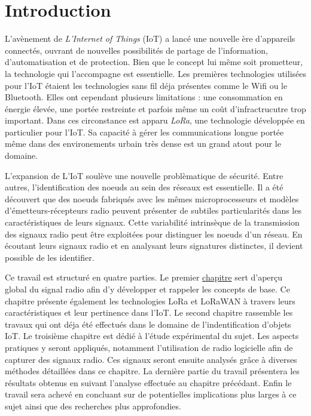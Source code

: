 

\chapter*{Introduction}

\renewcommand{\leftmark}{INTRODUCTION}

L'avènement de \textit{L'Internet of Things} (IoT) a lancé une nouvelle ère d'appareils connectés, ouvrant de nouvelles possibilités de partage de l'information, d'automatisation et de protection. Bien que le concept lui même soit prometteur, la technologie qui l'accompagne est essentielle.
Les premières technologies utilisées pour l'IoT étaient les technologies sans fil déja présentes comme le Wifi ou le Bluetooth. Elles ont cependant plusieurs limitations : une consommation en énergie élevée, une portée restreinte et parfois même un coût d'infractrucutre trop important.
Dans ces circonstance est apparu \textit{LoRa}, une technologie développée en particulier pour l'IoT. Sa capacité à gérer les communications longue portée même dans des environements urbain très dense est un grand atout pour le domaine.

\vspace{0.1cm}

L'expansion de L'IoT soulève une nouvelle problèmatique de sécurité. Entre autres, l'identification des noeuds au sein des réseaux est essentielle. Il a été découvert que des noeuds fabriqués avec les mêmes microprocesseurs et modèles d'émetteurs-récepteurs radio peuvent présenter de subtiles particularités dans les caractéristiques de leurs signaux. Cette variabilité intrinsèque de la transmission des signaux radio peut être exploitées pour distinguer les noeuds d’un réseau. En écoutant leurs signaux radio et en analysant leurs signatures distinctes, il devient possible de les identifier.

\vspace{0.1cm}

Ce travail est structuré en quatre parties. Le premier          \hyperref[chap1]{chapitre} sert d'aperçu global du signal radio afin d'y développer et rappeler les concepts de base. Ce chapitre présente également les technologies LoRa et LoRaWAN à travers leurs caractéristiques et leur pertinence dans l'IoT.
Le second chapitre rassemble les travaux qui ont déja été effectués dans le domaine de l'indentification d'objets IoT.
Le troisième chapitre est dédié à l'étude expérimental du sujet. Les aspects pratiques y seront appliqués, notamment l'utilisation de radio logicielle afin de capturer des signaux radio. Ces signaux seront ensuite analysés grâce à diverses méthodes détaillées dans ce chapitre.
La dernière partie du travail présentera les résultats obtenus en suivant l'analyse effectuée au chapitre précédant. Enfin le travail sera achevé en concluant sur de potentielles implications plus larges à ce sujet ainsi que des recherches plus approfondies.